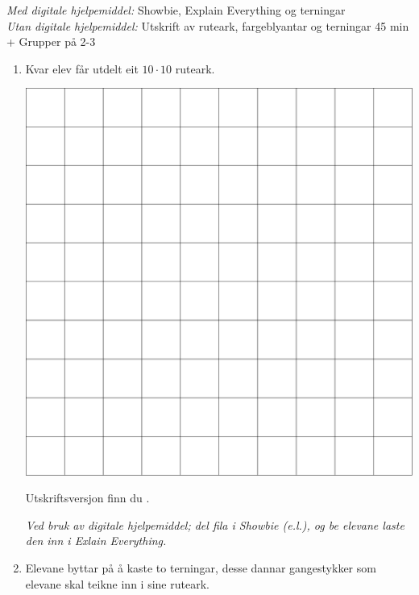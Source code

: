 




	\lst
	{
	}
	{
		\textsl{Med digitale hjelpemiddel:} Showbie, Explain Everything og terningar\\
		\textsl{Utan digitale hjelpemiddel:} Utskrift av ruteark, fargeblyantar og terningar}
	{45 min\,+}
	{Grupper på 2-3}
{
\vs
\begin{enumerate}
	\item Kvar elev får utdelt eit $ 10\cdot10 $ ruteark. 
	\begin{center}
		\includegraphics[scale=0.075]{gong1}
	\end{center}
	Utskriftsversjon finn du .
	
	\textit{Ved bruk av digitale hjelpemiddel; del fila i Showbie (e.l.), og be elevane laste den inn i Exlain Everything.}
	\item Elevane byttar på å kaste to terningar, desse dannar gangestykker som elevane skal teikne inn i sine ruteark.
\end{enumerate}

}

